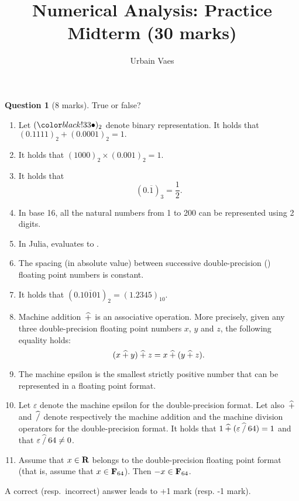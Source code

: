 \documentclass[11pt]{article}
\theoremstyle{definition}
\newtheorem{question}{Question}
\begin{document}
\title{Numerical Analysis: Practice Midterm (30 marks)}
\author{Urbain Vaes}
\maketitle

\begin{question}
    [8 marks]
    True or false?
    \begin{enumerate}
        \item Let $(\placeholder)_2$ denote binary representation.
            It holds that
            \(
                (0.1111)_2 + (0.0001)_2 = 1.
            \)
        \item It holds that
            \(
                (1000)_2 \times (0.001)_2 = 1.
            \)
        \item It holds that
            \[
                (0.\overline{1})_3 = \frac{1}{2}.
            \]
        \item In base 16, all the natural numbers from 1 to 200 can be represented using 2 digits.
        \item In Julia,  evaluates to .
        \item The spacing (in absolute value) between successive double-precision () floating point numbers is constant.
        \item It holds that $(0.\overline{10101})_2 = (1.2345)_{10}$.
        \item Machine addition~$\mathbin{\widehat +}$ is an associative operation.
            More precisely, given any three double-precision floating point numbers $x$, $y$ and $z$,
            the following equality holds:
            \[
                (x \mathbin{\widehat +} y) \mathbin{\widehat +} z = x \mathbin{\widehat +} (y \mathbin{\widehat +} z).
            \]
        \item
            The machine epsilon is the smallest strictly positive number that can be represented in a floating point format.

        \item
            Let $\varepsilon$ denote the machine epsilon for the double-precision format.
            Let also~$\mathbin{\widehat +}$ and~$\mathbin{\widehat /}$ denote respectively the machine addition and the machine division operators for the double-precision format.
            It holds that $1 \mathbin{\widehat +} (\varepsilon \mathbin{\widehat /} 64) = 1$ and that $\varepsilon \mathbin{\widehat /} 64 \neq 0$.

        \item
            Assume that $x \in \mathbf R$ belongs to the double-precision floating point format (that is,
            assume that $x \in \mathbf F_{64}$).
            Then $-x \in \mathbf F_{64}$.
    \end{enumerate}
    A correct (resp.~incorrect) answer leads to +1 mark (resp. -1 mark).
\end{question}
\end{document}
